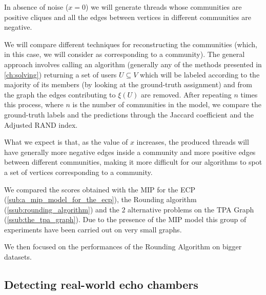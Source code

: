 In absence of noise ($x = 0$) we will generate threads whose communities are
positive cliques and all the edges between vertices in different communities
are negative.

We will compare different techniques for reconstructing the communities (which,
in this case, we will consider as corresponding to a community). The general
approach involves calling an algorithm (generally any of the methods presented
in \autoref{ch:solving}) returning a set of users $U \subseteq V$ which will be
labeled according to the majority of its members (by looking at the
ground-truth assignment) and from the graph the edges contributing to $\xi(U)$
are removed.  After repeating $n$ times this process, where $n$ is the number
of communities in the model, we compare the ground-truth labels and the
predictions through the Jaccard coefficient and the Adjusted RAND
index\footnotemark.


What we expect is that, as the value of $x$ increases, the produced threads
will have generally more negative edges inside a community and more positive
edges between different communities, making it more difficult for our
algorithms to spot a set of vertices corresponding to a community.

We compared the scores obtained with the \acrshort{MIP} for the \acrshort{ECP}
(\autoref{sub:a_mip_model_for_the_ecp}), the Rounding algorithm
(\autoref{ssub:rounding_algorithm}) and the $2$ alternative problems on the
\acrshort{TPA} Graph (\autoref{ssub:the_tpa_graph}). Due to the presence of the
\acrshort{MIP} model this group of experiments have been carried out on very
small graphs. %

We then focused on the performances of the Rounding Algorithm on bigger
datasets.


\subsection{Detecting real-world echo chambers}%
\label{sub:detecting_real_echo_chambers}

